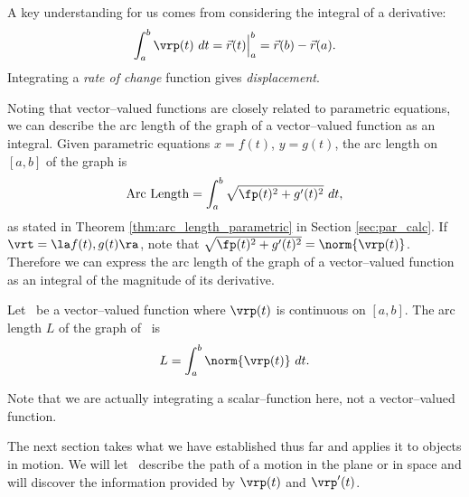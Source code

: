 A key understanding for us comes from considering the integral of a derivative: $$\int_a^b \vrp(t)\ dt = \vec r(t)\Big|_a^b = \vec r(b)-\vec r(a).$$ Integrating a \emph{rate of change} function gives \emph{displacement}.

Noting that vector--valued functions are closely related to parametric equations, we can describe the arc length of the graph of a vector--valued function as an integral. Given parametric equations $x=f(t)$, $y=g(t)$, the arc length on $[a,b]$ of the graph is
$$\text{Arc Length} = \int_a^b\sqrt{\fp(t)^2+g'(t)^2}\ dt,$$
as stated in Theorem \ref{thm:arc_length_parametric} in Section \ref{sec:par_calc}. If $\vrt = \la f(t), g(t)\ra$, note that $\sqrt{\fp(t)^2+g'(t)^2} = \norm{\vrp(t)}$. Therefore we can express the arc length of the graph of a vector--valued function as an integral of the magnitude of its derivative.

{Let \vrt\ be a vector--valued function where $\vrp(t)$ is continuous on $[a,b]$. The arc length $L$ of the graph of \vrt\ is 
$$L = \int_a^b \norm{\vrp(t)}\ dt.$$
}

Note that we are actually integrating a scalar--function here, not a vector--valued function.

The next section takes what we have established thus far and applies it to objects in motion. We will let \vrt\ describe the path of a motion in the plane or in space and will discover the information provided by $\vrp(t)$ and $\vrp'(t)$.

